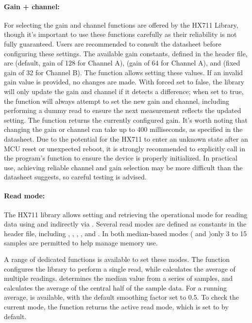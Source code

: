 \paragraph{Gain + channel:}
For selecting the gain and channel functions are offered by the HX711 Library, though it’s important to use these functions carefully as their reliability is not fully guaranteed. Users are recommended to consult the datasheet before configuring these settings.
The available gain constants, defined in the header file, are  (default, gain of 128 for Channel A),  (gain of 64 for Channel A), and  (fixed gain of 32 for Channel B). The  function allows setting these values. If an invalid gain value is provided, no changes are made. With forced set to false, the library will only update the gain and channel if it detects a difference; when set to true, the function will always attempt to set the new gain and channel, including performing a dummy read to ensure the next measurement reflects the updated setting. The  function returns the currently configured gain. It’s worth noting that changing the gain or channel can take up to 400 milliseconds, as specified in the datasheet. Due to the potential for the HX711 to enter an unknown state after an MCU reset or unexpected reboot, it is strongly recommended to explicitly call  in the program’s  function to ensure the device is properly initialized. In practical use, achieving reliable channel and gain selection may be more difficult than the datasheet suggests, so careful testing is advised.

\paragraph{Read mode:}
The HX711 library allows setting and retrieving the operational mode for reading data using  and indirectly via . Several read modes are defined as constants in the header file, including , , , , and . In both median-based modes ( and )only 3 to 15 samples are permitted to help manage memory use.

A range of dedicated functions is available to set these modes. The  function configures the library to perform a single read, while  calculates the average of multiple readings.  determines the median value from a series of samples, and  calculates the average of the central half of the sample data. For a running average,  is available, with the default smoothing factor set to 0.5. To check the current mode, the  function returns the active read mode, which is set to  by default.

